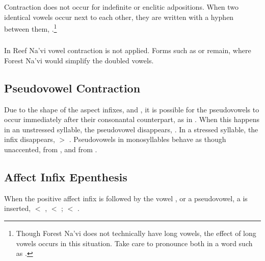 \subsubsection{} Contraction does not occur for indefinite  or
enclitic adpositions.  When two identical vowels occur next to each
other, they are written with a hyphen between them, 
  .\footnote{Though Forest
Na'vi does not technically have long vowels, the effect of long vowels
occurs in this situation.  Take care to pronounce both  in a word
such as .}

\subsubsection{} In Reef Na'vi vowel contraction is not applied.
Forms such as  or  remain, where Forest Na'vi
would simplify the doubled vowels.
\label{rn:no-contract}

\subsection{Pseudovowel Contraction} 
 Due to the shape of the aspect infixes, 
and , it is possible for the pseudovowels to occur
immediately after their consonantal counterpart, as
in .  When this happens in an unstressed
syllable, the pseudovowel disappears, .  In a stressed
syllable, the infix disappears,  $>$
.  Pseudovowels in monosyllables behave as though
unaccented,  from , and 
from .

\subsection{Affect Infix Epenthesis} When the positive affect infix
 is followed by the vowel ,  or a pseudovowel, a
 is inserted,  $<$ ,  $<$
;  $<$ .
\label{l-and-s:eiy-epenth}

